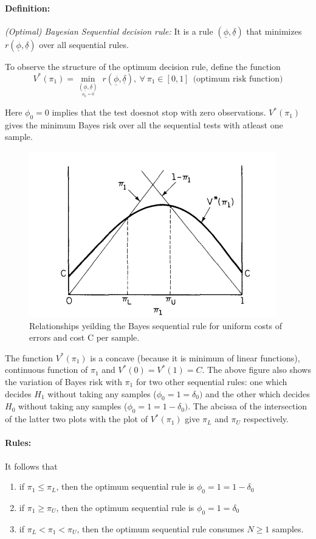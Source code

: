 \documentclass[12pt,a4paper]{article}
\newcommand{\uphi}{\underline{\phi}}
\newcommand{\udel}{\underline{\delta}}
\begin{document}
\paragraph{Definition:} \emph{(Optimal) Bayesian Sequential decision rule:} It is a rule $(\uphi,\udel)$ that minimizes $r(\uphi,\udel)$ over all sequential rules.

To observe the structure of the optimum decision rule, define the function 
\begin{equation}
V^*(\pi_1)=\underset{\underset{\phi_0=0}{(\uphi,\udel)}}\min\;r(\uphi,\udel),\  \forall\  \pi_1\in[0,1]\ \  \textrm{(optimum risk function)}
\end{equation}

Here $\phi_0=0$ implies that the test doesnot stop with zero observations. $V^*(\pi_1)$ gives the minimum Bayes risk over all the sequential tests with atleast one sample.

\begin{figure}
\centering
\includegraphics[scale=0.8]{figures/bayesseqrule.png}
\caption{Relationships yeilding the Bayes sequential rule for uniform costs of errors and cost C per sample.}
\end{figure}

The function $V^*(\pi_1)$ is a concave (because it is minimum of linear functions), continuous function of $\pi_1$ and $V^*(0)=V^*(1)=C$. The above figure also shows the variation of Bayes risk with $\pi_1$ for two other sequential rules: one which decides $H_1$ without taking any samples ($\phi_0=1=\delta_0)$ and the other which decides $H_0$ without taking any samples ($\phi_0=1=1-\delta_0)$. The abcissa of the intersection of the latter two plots with the plot of $V^*(\pi_1)$ give $\pi_L$ and $\pi_U$ respectively.
\paragraph{Rules:} It follows that
\begin{enumerate}
\item if $\pi_1\leq\pi_L$, then the optimum sequential rule is $\phi_0=1=1-\delta_0$
\item if $\pi_1\geq\pi_U$, then the optimum sequential rule is $\phi_0=1=\delta_0$
\item if $\pi_L<\pi_1<\pi_U$, then the optimum sequential rule consumes $N\geq1$ samples.
\end{enumerate}
\end{document}
